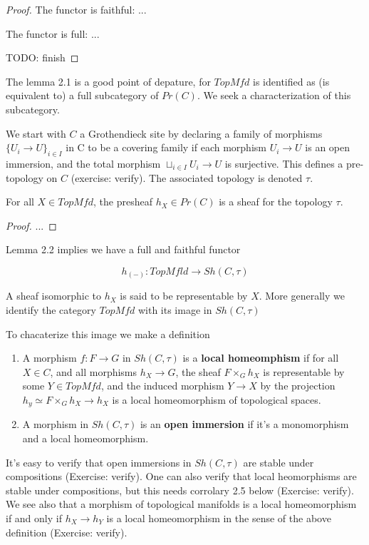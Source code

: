 \documentclass[../main.tex]{subfiles}
\begin{document}
\begin{proof}
The functor is faithful: ...

The functor is full: ...

TODO: finish
\end{proof}

The lemma 2.1 is a good point of depature, for $TopMfd$ is identified as (is equivalent to) a full subcategory of $Pr(C)$. We seek a characterization of this subcategory.

We start with $C$ a Grothendieck site by declaring a family of morphisms $\{U_i \to U\}_{i \in I}$ in C to be a covering family if each morphism $U_i \to U$ is an open immersion, and the total morphism $\sqcup_{i \in I} U_i \to U$ is surjective. This defines a pre-topology on $C$ (exercise: verify). The associated topology is denoted $\tau$.

\begin{lem}
    For all $X \in TopMfd$, the presheaf $h_X \in Pr(C)$ is a sheaf for the topology $\tau$.
\end{lem}

\begin{proof}
    ...
\end{proof}

Lemma 2.2 implies we have a full and faithful functor

\[
h_{(-)}: TopMfld \to Sh(C, \tau)
\]

A sheaf isomorphic to $h_X$ is said to be representable by $X$. More generally we identify the category $TopMfd$ with its image in $Sh(C, \tau)$

To chacaterize this image we make a definition

\begin{defn}
    \begin{enumerate}
            \item A morphism $f: F \to G$ in $Sh(C, \tau)$ is a \textbf{local homeomphism} if for all $X \in C$, and all morphisms $h_X \to G$, the sheaf $F \times_G h_X$ is representable by some $Y \in TopMfd$, and the induced morphism $Y \to X$ by the projection $h_y \simeq F \times_G h_X \to h_X$ is a local homeomorphism of topological spaces.

            \item A morphism in $Sh(C, \tau)$ is an \textbf{open immersion} if it's a monomorphism and a local homeomorphism.
    \end{enumerate}
\end{defn}

It's easy to verify that open immersions in $Sh(C, \tau)$ are stable under compositions (Exercise: verify). One can also verify that local heomorphisms are stable under compositions, but this needs corrolary 2.5 below (Exercise: verify). We see also that a morphism of topological manifolds is a local homeomorphism if and only if $h_X \to h_Y$ is a local homeomorphism in the sense of the above definition (Exercise: verify).
\end{document}
